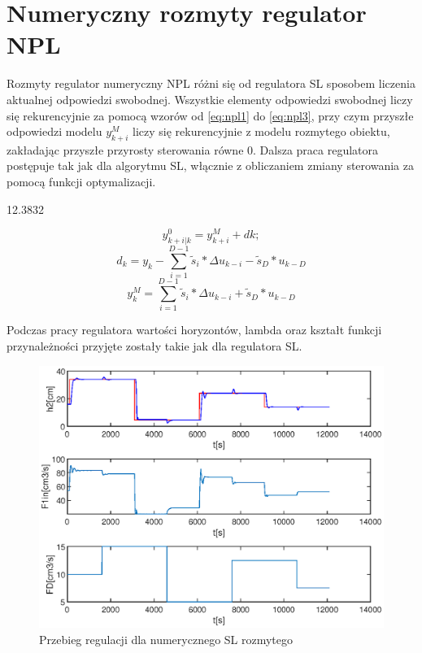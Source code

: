 \chapter{Numeryczny rozmyty regulator NPL}
	Rozmyty regulator numeryczny NPL różni się od regulatora SL sposobem liczenia aktualnej odpowiedzi swobodnej. Wszystkie elementy odpowiedzi swobodnej liczy się rekurencyjnie za pomocą wzorów od \ref{eq:npl1} do \ref{eq:npl3}, przy czym przyszłe odpowiedzi modelu $y_{k+i}^M$ liczy się rekurencyjnie z modelu rozmytego obiektu, zakładając przyszłe przyrosty sterowania równe 0.	Dalsza praca regulatora postępuje tak jak dla algorytmu SL, włącznie z obliczaniem zmiany sterowania za pomocą funkcji optymalizacji.
	
	12.3832
	

	\begin{equation}
		y_{k+i|k}^0=y_{k+i}^M+dk;
		\label{eq:npl1}
	\end{equation}
	\begin{equation}
		d_k = y_k-\sum_{i=1}^{D-1}\tilde{s}_i*\Delta u_{k-i}-\tilde{s}_D*u_{k-D}
		\label{eq:npl2}
	\end{equation}
	\begin{equation}
		y_{k}^M = \sum_{i=1}^{D-1}\tilde{s}_i*\Delta u_{k-i}+\tilde{s}_D*u_{k-D}
		\label{eq:npl3}
	\end{equation}
	
	Podczas pracy regulatora wartości horyzontów, lambda oraz kształt funkcji przynależności przyjęte zostały takie jak dla regulatora SL.
	
	\begin{figure}[h!]
		\includegraphics[width=0.9\linewidth]{plots/z3_fdmc_sl.eps}
		\caption{Przebieg regulacji dla numerycznego SL rozmytego}
		\label{rys:npl}
	\end{figure}

